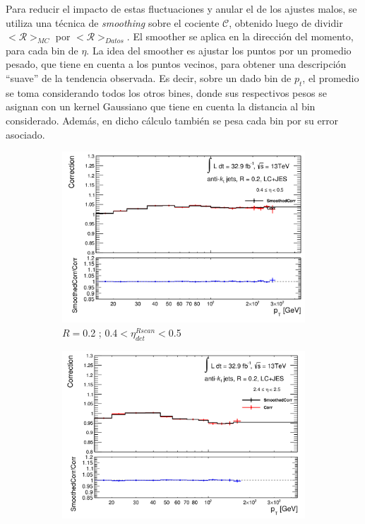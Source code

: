 Para reducir el impacto de estas fluctuaciones y anular el de los ajustes malos, se utiliza una técnica de \textit{smoothing} sobre el cociente $\mathcal{C}$, obtenido luego de dividir $<\mathcal{R}>_{MC}$ por $<\mathcal{R}>_{Datos}$. El smoother se aplica en la dirección del momento, para cada bin de $\eta$. La idea del smoother es ajustar los puntos por un promedio pesado, que tiene en cuenta a los puntos vecinos, para obtener una descripción ``suave'' de la tendencia observada. Es decir, sobre un dado bin de $p_t$, el promedio se toma considerando todos los otros bines, donde sus respectivos pesos se asignan con un kernel Gaussiano que tiene en cuenta la distancia al bin considerado. Además, en dicho cálculo también se pesa cada bin por su error asociado.   

\begin{figure}[ht]
    \centering
    \begin{subfigure}[b]{0.495\textwidth}
        \centering
        \includegraphics[width=\textwidth]{images/Smo_2LC_pt_49.png}
        \caption{$R=$0.2 ; 0.4$<\eta^{Rscan}_{det}<$0.5}
    \end{subfigure}
    \hfill
    \begin{subfigure}[b]{0.495\textwidth}
        \centering
        \includegraphics[width=\textwidth]{images/Smo_2LC_pt_69.png}

\end{subfigure}
\end{figure}
